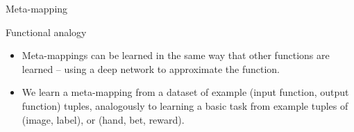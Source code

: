 \documentclass[final]{beamer}
\begin{document}
\begin{frame}[t]{}
\begin{columns}
\begin{column}[t]{0.248\textwidth}
\begin{block}{\huge Meta-mapping}
\begin{itemize}
\end{itemize}
\end{block}
\begin{block}{\huge Functional analogy}
\vspace{-0.6em}
\begin{itemize}
\item Meta-mappings can be learned in the same way that other functions are learned -- using a deep network to approximate the function.
\item We learn a meta-mapping from a dataset of example (input function, output function) tuples, analogously to learning a basic task from example tuples of (image, label), or (hand, bet, reward). 
\end{itemize}
\end{block}
\end{column}


\end{columns}
\end{frame}
\end{document}
